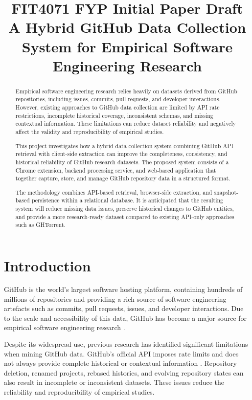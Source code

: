 \documentclass[conference]{IEEEtran}
\title{FIT4071 FYP Initial Paper Draft\\
A Hybrid GitHub Data Collection System for Empirical Software Engineering Research}
\author{
\IEEEauthorblockN{Agamjot Singh, Brandon Luu, William Richter}
\IEEEauthorblockA{Faculty of Information Technology\\
Monash University\\
Melbourne, Australia}
}
\begin{document}
\maketitle

\begin{abstract}
Empirical software engineering research relies heavily on datasets derived from GitHub repositories, including issues, commits, pull requests, and developer interactions. However, existing approaches to GitHub data collection are limited by API rate restrictions, incomplete historical coverage, inconsistent schemas, and missing contextual information. These limitations can reduce dataset reliability and negatively affect the validity and reproducibility of empirical studies.

This project investigates how a hybrid data collection system combining GitHub API retrieval with client-side extraction can improve the completeness, consistency, and historical reliability of GitHub research datasets. The proposed system consists of a Chrome extension, backend processing service, and web-based application that together capture, store, and manage GitHub repository data in a structured format.

The methodology combines API-based retrieval, browser-side extraction, and snapshot-based persistence within a relational database. It is anticipated that the resulting system will reduce missing data issues, preserve historical changes to GitHub entities, and provide a more research-ready dataset compared to existing API-only approaches such as GHTorrent.
\end{abstract}

\section{Introduction}
GitHub is the world's largest software hosting platform, containing hundreds of millions of repositories and providing a rich source of software engineering artefacts such as commits, pull requests, issues, and developer interactions. Due to the scale and accessibility of this data, GitHub has become a major source for empirical software engineering research \cite{cosentino2016,kalliamvakou2014,tsay2014}.

Despite its widespread use, previous research has identified significant limitations when mining GitHub data. GitHub's official API imposes rate limits and does not always provide complete historical or contextual information \cite{gousios2017,kalliamvakou2016}. Repository deletion, renamed projects, rebased histories, and evolving repository states can also result in incomplete or inconsistent datasets. These issues reduce the reliability and reproducibility of empirical studies.
\end{document}
